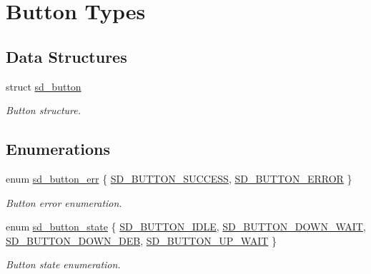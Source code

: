 \hypertarget{group___s_d___button___types}{}\section{Button Types}
\label{group___s_d___button___types}
\subsection*{Data Structures}
\begin{DoxyCompactItemize}
\item 
struct \mbox{\hyperlink{structsd__button}{sd\+\_\+button}}
\begin{DoxyCompactList}\small\item\em Button structure. \end{DoxyCompactList}\end{DoxyCompactItemize}
\subsection*{Enumerations}
\begin{DoxyCompactItemize}
\item 
enum \mbox{\hyperlink{group___s_d___button___types_ga93131f1a3e8fe4f740d62e8ac62685e8}{sd\+\_\+button\+\_\+err}} \{ \mbox{\hyperlink{group___s_d___button___types_gga93131f1a3e8fe4f740d62e8ac62685e8a4dfca3cbf0aed46511901c12ac832585}{S\+D\+\_\+\+B\+U\+T\+T\+O\+N\+\_\+\+S\+U\+C\+C\+E\+SS}}, 
\mbox{\hyperlink{group___s_d___button___types_gga93131f1a3e8fe4f740d62e8ac62685e8a997fc9d6c2ea95ecc61dc90fe1edb219}{S\+D\+\_\+\+B\+U\+T\+T\+O\+N\+\_\+\+E\+R\+R\+OR}}
 \}
\begin{DoxyCompactList}\small\item\em Button error enumeration. \end{DoxyCompactList}\item 
enum \mbox{\hyperlink{group___s_d___button___types_gad961a8af755b135c7e69a304d4f6303c}{sd\+\_\+button\+\_\+state}} \{ \mbox{\hyperlink{group___s_d___button___types_ggad961a8af755b135c7e69a304d4f6303cacc42f7640a397b5daf63328ab9ae0d88}{S\+D\+\_\+\+B\+U\+T\+T\+O\+N\+\_\+\+I\+D\+LE}}, 
\mbox{\hyperlink{group___s_d___button___types_ggad961a8af755b135c7e69a304d4f6303cafbe7ffa1bfcd9e4b225bcceec360042d}{S\+D\+\_\+\+B\+U\+T\+T\+O\+N\+\_\+\+D\+O\+W\+N\+\_\+\+W\+A\+IT}}, 
\mbox{\hyperlink{group___s_d___button___types_ggad961a8af755b135c7e69a304d4f6303cae5ac55f2e541b7d0295df36ecc6ac09f}{S\+D\+\_\+\+B\+U\+T\+T\+O\+N\+\_\+\+D\+O\+W\+N\+\_\+\+D\+EB}}, 
\mbox{\hyperlink{group___s_d___button___types_ggad961a8af755b135c7e69a304d4f6303ca69a7dbe193b45ebd832d57ed188fb9d6}{S\+D\+\_\+\+B\+U\+T\+T\+O\+N\+\_\+\+U\+P\+\_\+\+W\+A\+IT}}
 \}
\begin{DoxyCompactList}\small\item\em Button state enumeration. \end{DoxyCompactList}\end{DoxyCompactItemize}


